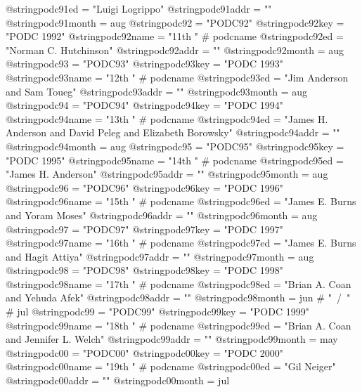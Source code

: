 @string{podc91ed =              "Luigi Logrippo"}
@string{podc91addr =            ""}
@string{podc91month =           aug}
@string{podc92 =                "PODC92"}
@string{podc92key =             "PODC 1992"}
@string{podc92name =            "11th " # podcname}
@string{podc92ed =              "Norman C. Hutchinson"}
@string{podc92addr =            ""}
@string{podc92month =           aug}
@string{podc93 =                "PODC93"}
@string{podc93key =             "PODC 1993"}
@string{podc93name =            "12th " # podcname}
@string{podc93ed =              "Jim Anderson and Sam Toueg"}
@string{podc93addr =            ""}
@string{podc93month =           aug}
@string{podc94 =                "PODC94"}
@string{podc94key =             "PODC 1994"}
@string{podc94name =            "13th " # podcname}
@string{podc94ed =              "James H. Anderson and David Peleg and Elizabeth Borowsky"}
@string{podc94addr =            ""}
@string{podc94month =           aug}
@string{podc95 =                "PODC95"}
@string{podc95key =             "PODC 1995"}
@string{podc95name =            "14th " # podcname}
@string{podc95ed =              "James H. Anderson"}
@string{podc95addr =            ""}
@string{podc95month =           aug}
@string{podc96 =                "PODC96"}
@string{podc96key =             "PODC 1996"}
@string{podc96name =            "15th " # podcname}
@string{podc96ed =              "James E. Burns and Yoram Moses"}
@string{podc96addr =            ""}
@string{podc96month =           aug}
@string{podc97 =                "PODC97"}
@string{podc97key =             "PODC 1997"}
@string{podc97name =            "16th " # podcname}
@string{podc97ed =              "James E. Burns and Hagit Attiya"}
@string{podc97addr =            ""}
@string{podc97month =           aug}
@string{podc98 =                "PODC98"}
@string{podc98key =             "PODC 1998"}
@string{podc98name =            "17th " # podcname}
@string{podc98ed =              "Brian A. Coan and Yehuda Afek"}
@string{podc98addr =            ""}
@string{podc98month =           jun # "~/~" # jul}
@string{podc99 =                "PODC99"}
@string{podc99key =             "PODC 1999"}
@string{podc99name =            "18th " # podcname}
@string{podc99ed =              "Brian A. Coan and Jennifer L. Welch"}
@string{podc99addr =            ""}
@string{podc99month =           may}
@string{podc00 =                "PODC00"}
@string{podc00key =             "PODC 2000"}
@string{podc00name =            "19th " # podcname}
@string{podc00ed =              "Gil Neiger"}
@string{podc00addr =            ""}
@string{podc00month =           jul}
